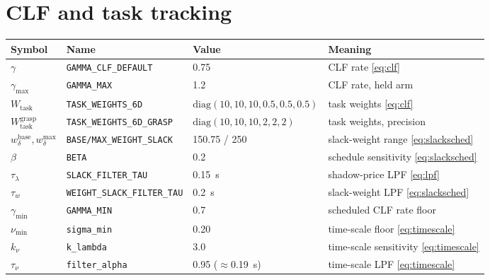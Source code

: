 \section{CLF and task tracking}
\begin{tabularx}{\linewidth}{@{}l>{\scriptsize}ll>{\raggedright\arraybackslash}X@{}}
\toprule
Symbol & Name & Value & Meaning \\
\midrule
$\gamma$ & \texttt{GAMMA\_CLF\_DEFAULT} & 0.75 & CLF rate \eqref{eq:clf} \\
$\gamma_{\max}$ & \texttt{GAMMA\_MAX} & 1.2 & CLF rate, held arm \\
$W_{\text{task}}$ & \texttt{TASK\_WEIGHTS\_6D} & $\mathrm{diag}(10,10,10,0.5,0.5,0.5)$ & task weights \eqref{eq:clf} \\
$W_{\text{task}}^{\text{grasp}}$ & \texttt{TASK\_WEIGHTS\_6D\_GRASP} & $\mathrm{diag}(10,10,10,2,2,2)$ & task weights, precision \\
$w_{\delta}^{\text{base}}, w_{\delta}^{\max}$ & \texttt{BASE/MAX\_WEIGHT\_SLACK} & 150.75 / 250 & slack-weight range \eqref{eq:slacksched} \\
$\beta$ & \texttt{BETA} & 0.2 & schedule sensitivity \eqref{eq:slacksched} \\
$\tau_{\lambda}$ & \texttt{SLACK\_FILTER\_TAU} & 0.15~s & shadow-price LPF \eqref{eq:lpf} \\
$\tau_{w}$ & \texttt{WEIGHT\_SLACK\_FILTER\_TAU} & 0.2~s & slack-weight LPF \eqref{eq:slacksched} \\
$\gamma_{\min}$ & \texttt{GAMMA\_MIN} & 0.7 & scheduled CLF rate floor \\
$\nu_{\min}$ & \texttt{sigma\_min} & 0.20 & time-scale floor \eqref{eq:timescale} \\
$k_{\nu}$ & \texttt{k\_lambda} & 3.0 & time-scale sensitivity \eqref{eq:timescale} \\
$\tau_{\nu}$ & \texttt{filter\_alpha} & 0.95 ($\approx$0.19~s) & time-scale LPF \eqref{eq:timescale} \\
\bottomrule
\end{tabularx}

